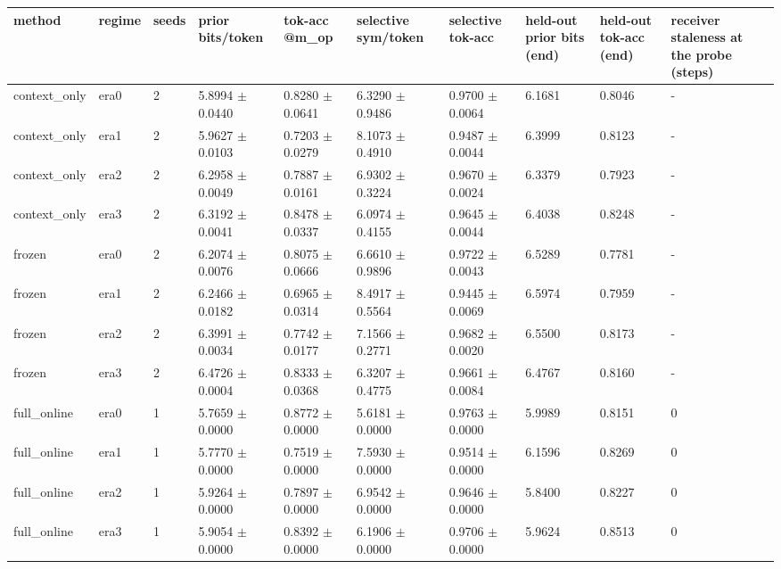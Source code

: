 \begin{tabular}{llllllllll}
\hline
method & regime & seeds & prior bits/token & tok-acc @m\_op & selective sym/token & selective tok-acc & held-out prior bits (end) & held-out tok-acc (end) & receiver staleness at the probe (steps) \\
\hline
context\_only & era0 & 2 & 5.8994 $\pm$ 0.0440 & 0.8280 $\pm$ 0.0641 & 6.3290 $\pm$ 0.9486 & 0.9700 $\pm$ 0.0064 & 6.1681 & 0.8046 & - \\
context\_only & era1 & 2 & 5.9627 $\pm$ 0.0103 & 0.7203 $\pm$ 0.0279 & 8.1073 $\pm$ 0.4910 & 0.9487 $\pm$ 0.0044 & 6.3999 & 0.8123 & - \\
context\_only & era2 & 2 & 6.2958 $\pm$ 0.0049 & 0.7887 $\pm$ 0.0161 & 6.9302 $\pm$ 0.3224 & 0.9670 $\pm$ 0.0024 & 6.3379 & 0.7923 & - \\
context\_only & era3 & 2 & 6.3192 $\pm$ 0.0041 & 0.8478 $\pm$ 0.0337 & 6.0974 $\pm$ 0.4155 & 0.9645 $\pm$ 0.0044 & 6.4038 & 0.8248 & - \\
frozen & era0 & 2 & 6.2074 $\pm$ 0.0076 & 0.8075 $\pm$ 0.0666 & 6.6610 $\pm$ 0.9896 & 0.9722 $\pm$ 0.0043 & 6.5289 & 0.7781 & - \\
frozen & era1 & 2 & 6.2466 $\pm$ 0.0182 & 0.6965 $\pm$ 0.0314 & 8.4917 $\pm$ 0.5564 & 0.9445 $\pm$ 0.0069 & 6.5974 & 0.7959 & - \\
frozen & era2 & 2 & 6.3991 $\pm$ 0.0034 & 0.7742 $\pm$ 0.0177 & 7.1566 $\pm$ 0.2771 & 0.9682 $\pm$ 0.0020 & 6.5500 & 0.8173 & - \\
frozen & era3 & 2 & 6.4726 $\pm$ 0.0004 & 0.8333 $\pm$ 0.0368 & 6.3207 $\pm$ 0.4775 & 0.9661 $\pm$ 0.0084 & 6.4767 & 0.8160 & - \\
full\_online & era0 & 1 & 5.7659 $\pm$ 0.0000 & 0.8772 $\pm$ 0.0000 & 5.6181 $\pm$ 0.0000 & 0.9763 $\pm$ 0.0000 & 5.9989 & 0.8151 & 0 \\
full\_online & era1 & 1 & 5.7770 $\pm$ 0.0000 & 0.7519 $\pm$ 0.0000 & 7.5930 $\pm$ 0.0000 & 0.9514 $\pm$ 0.0000 & 6.1596 & 0.8269 & 0 \\
full\_online & era2 & 1 & 5.9264 $\pm$ 0.0000 & 0.7897 $\pm$ 0.0000 & 6.9542 $\pm$ 0.0000 & 0.9646 $\pm$ 0.0000 & 5.8400 & 0.8227 & 0 \\
full\_online & era3 & 1 & 5.9054 $\pm$ 0.0000 & 0.8392 $\pm$ 0.0000 & 6.1906 $\pm$ 0.0000 & 0.9706 $\pm$ 0.0000 & 5.9624 & 0.8513 & 0 \\

\end{tabular}
